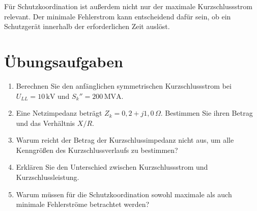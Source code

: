 Für Schutzkoordination ist außerdem nicht nur der maximale Kurzschlussstrom
relevant. Der minimale Fehlerstrom kann entscheidend dafür sein, ob ein
Schutzgerät innerhalb der erforderlichen Zeit auslöst.

\section{Übungsaufgaben}

\begin{enumerate}
  \item Berechnen Sie den anfänglichen symmetrischen Kurzschlussstrom
        bei \(U_{LL}=10\,\mathrm{kV}\) und \(S_k''=200\,\mathrm{MVA}\).
  \item Eine Netzimpedanz beträgt \(Z_k=0{,}2+j1{,}0\,\Omega\).
        Bestimmen Sie ihren Betrag und das Verhältnis \(X/R\).
  \item Warum reicht der Betrag der Kurzschlussimpedanz nicht aus,
        um alle Kenngrößen des Kurzschlussverlaufs zu bestimmen?
  \item Erklären Sie den Unterschied zwischen Kurzschlussstrom und
        Kurzschlussleistung.
  \item Warum müssen für die Schutzkoordination sowohl maximale als
        auch minimale Fehlerströme betrachtet werden?
\end{enumerate}
